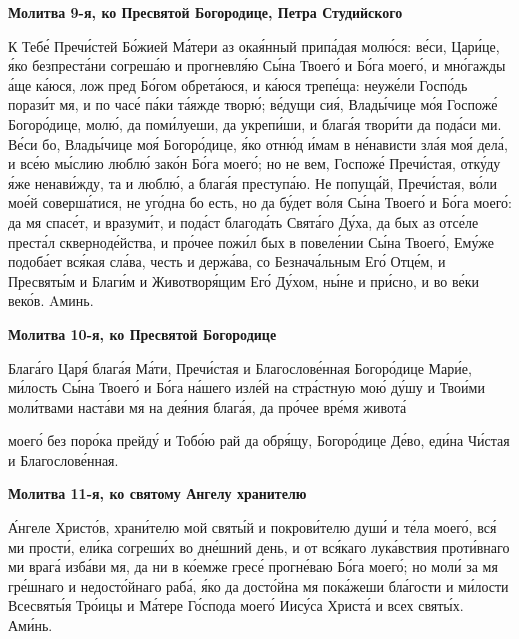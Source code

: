  

\bfseries Молитва 9-я, ко Пресвятой Богородице, Петра Студийского\normalfont{}


   К Тебе́ Пречи́стей Бо́жией Ма́тери аз окая́нный припа́дая молю́ся: ве́си,
Цари́це, я́ко безпреста́ни согреша́ю и прогневля́ю Сы́на Твоего́ и Бо́га
моего́, и мно́гажды а́ще ка́юся, лож пред Бо́гом обрета́юся, и ка́юся
трепе́ща: неуже́ли Госпо́дь порази́т мя, и по часе́ па́ки та́яжде творю́;
ве́дущи сия́, Влады́чице мо́я Госпоже́ Богоро́дице, молю́, да поми́луеши,
да укрепи́ши, и блага́я твори́ти да пода́си ми. Ве́си бо, Влады́чице
моя́ Богоро́дице, я́ко отню́д и́мам в не́нависти зла́я моя́ дела́, и все́ю
мы́слию люблю́ зако́н Бо́га моего́; но не вем, Госпоже́ Пречи́стая,
отку́ду я́же ненави́жду, та и люблю́, а блага́я преступа́ю. Не попуща́й,
Пречи́стая, во́ли мое́й соверша́тися, не уго́дна бо есть, но да бу́дет
во́ля Сы́на Твоего́ и Бо́га моего́: да мя спасе́т, и вразуми́т, и пода́ст
благода́ть Свята́го Ду́ха, да бых аз отсе́ле преста́л скверноде́йства, и
про́чее пожи́л бых в повеле́нии Сы́на Твоего́, Ему́же подоба́ет вся́кая
сла́ва, честь и держа́ва, со Безнача́льным Его́ Отце́м, и Пресвяты́м и
Благи́м и Животворя́щим Его́ Ду́хом, ны́не и при́сно, и во ве́ки веко́в.
Aминь.



 

\bfseries Молитва 10-я, ко Пресвятой Богородице\normalfont{}


   Блага́го Царя́ блага́я Ма́ти, Пречи́стая и Благослове́нная Богоро́дице
Мари́е, ми́лость Сы́на Твоего́ и Бо́га на́шего изле́й на стра́стную мою́ ду́шу и
Твои́ми моли́твами наста́ви мя на дея́ния блага́я, да про́чее вре́мя живота́

моего́ без поро́ка прейду́ и Тобо́ю рай да обря́щу, Богоро́дице Де́во, еди́на
Чи́стая и Благослове́нная.



 

\bfseries Молитва 11-я, ко святому Ангелу хранителю\normalfont{}


   А́нгеле Христо́в, храни́телю мой святы́й и покрови́телю души́ и те́ла
моего́, вся́ ми прости́, ели́ка согреши́х во дне́шний день, и от вся́каго
лука́вствия проти́внаго ми врага́ изба́ви мя, да ни в ко́емже гресе́ прогне́ваю
Бо́га моего́; но моли́ за мя гре́шнаго и недосто́йнаго раба́, я́ко да досто́йна мя
пока́жеши бла́гости и ми́лости Всесвяты́я Тро́ицы и Ма́тере Го́спода моего́
Иису́са Христа́ и всех святы́х. Ами́нь.



